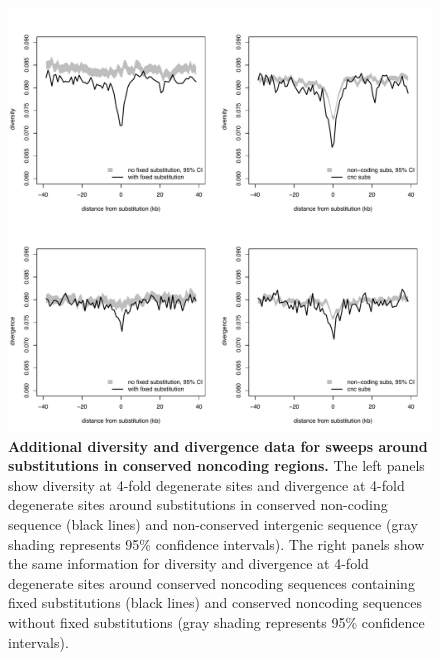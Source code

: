 \begin{figure}[h!]
      \centering
       \includegraphics[width=\linewidth]{Ch2FigS9}
    \caption{\textbf{Additional diversity and divergence data for sweeps around substitutions in conserved noncoding regions.} The left panels show diversity at 4-fold degenerate sites and divergence at 4-fold degenerate sites around substitutions in conserved non-coding sequence (black lines) and non-conserved intergenic sequence (gray shading represents 95\% confidence intervals). The right panels show the same information for diversity and divergence at 4-fold degenerate sites around conserved noncoding sequences containing fixed substitutions (black lines) and conserved noncoding sequences without fixed substitutions (gray shading represents 95\% confidence intervals).}
    \label{fig:figS9}
\end{figure}

